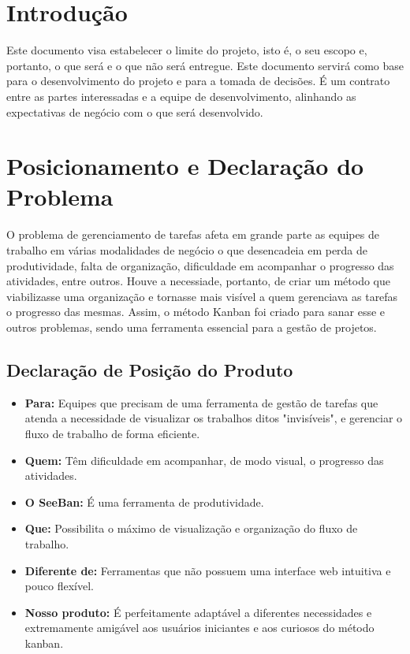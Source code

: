 \section{Introdução}
Este documento visa estabelecer o limite do projeto, isto é, o seu escopo 
e, portanto, o que será e o que não será entregue. Este documento servirá como 
base para o desenvolvimento do projeto e para a tomada de decisões. É um
contrato entre as partes interessadas e a equipe de desenvolvimento, 
alinhando as expectativas de negócio com o que será desenvolvido.

\section{Posicionamento e Declaração do Problema}
O problema de gerenciamento de tarefas afeta em grande parte as equipes
de trabalho em várias modalidades de negócio o que desencadeia em 
perda de produtividade, falta de organização, dificuldade em acompanhar o 
progresso das atividades, entre outros. Houve a necessiade, portanto, de
criar um método que viabilizasse uma organização e tornasse mais visível
a quem gerenciava as tarefas o progresso das mesmas. Assim, o método Kanban
foi criado para sanar esse e outros problemas, sendo uma ferramenta essencial
para a gestão de projetos.  

\subsection{Declaração de Posição do Produto}
\begin{itemize}
    \item \textbf{Para:} Equipes que precisam de uma ferramenta de gestão de tarefas que atenda a necessidade de visualizar os trabalhos ditos "invisíveis", e gerenciar o fluxo de trabalho de forma eficiente. 
    \item \textbf{Quem:} Têm dificuldade em acompanhar, de modo visual, o progresso das atividades.
    \item \textbf{O SeeBan:} É uma ferramenta de produtividade. 
    \item \textbf{Que:} Possibilita o máximo de visualização e organização do fluxo de trabalho.
    \item \textbf{Diferente de:} Ferramentas que não possuem uma interface web intuitiva e pouco flexível.
    \item \textbf{Nosso produto:} É perfeitamente adaptável a diferentes necessidades e extremamente amigável aos usuários iniciantes e aos curiosos do método kanban.
\end{itemize}

